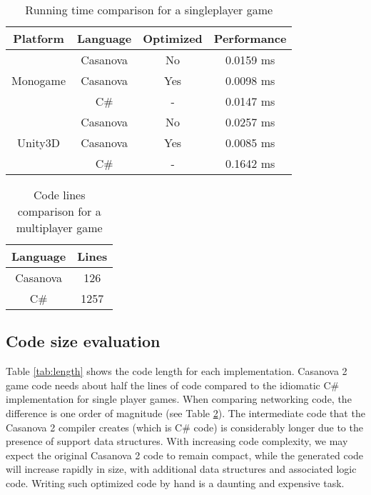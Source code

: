 \begin{table}
\caption{Running time comparison for a singleplayer game}
\label{tab:times}
\centering
\begin{tabular}{ @{}|c|c|c|c|@{} }
\hline
 Platform & Language & Optimized & Performance\\ \hline
\multirow{3}{*}{Monogame}
  & Casanova & No & 0.0159 ms\\
  & Casanova & Yes & 0.0098 ms\\
  & C\# &   - & 0.0147 ms\\ \hline
\multirow{3}{*}{Unity3D}
  & Casanova & No & 0.0257 ms\\
  & Casanova & Yes & 0.0085 ms\\
  & C\# &   - & 0.1642 ms\\ \hline
\hline
\end{tabular}
\end{table}

\begin{table}
\caption{Code lines comparison for a multiplayer game}
\centering
\label{tab:networking}
\centering
\begin{tabular}{ @{}|c|c|@{} }
	\hline
	Language & Lines \\ \hline
	Casanova & 126 \\
	\hline
	C\# &  1257 \\
	\hline
\end{tabular}
\end{table}

\subsection{Code size evaluation}
Table \ref{tab:length} shows the code length for each implementation. Casanova 2 game code needs about half the lines of code compared to the idiomatic C\# implementation for single player games. When comparing networking code, the difference is one order of magnitude (see Table \ref{tab:networking}). The intermediate code that the Casanova 2 compiler creates (which is C\# code) is considerably longer due to the presence of support data structures. With increasing code complexity, we may expect the original Casanova 2 code to remain compact, while the generated code will increase rapidly in size, with additional data structures and associated logic code. Writing such optimized code by hand is a daunting and expensive task.